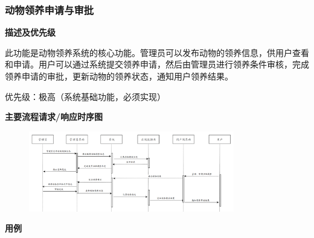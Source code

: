 \documentclass[12pt,a4paper,UTF8]{article}
\begin{document}
\subsubsection{动物领养申请与审批}

\noindent\textbf{描述及优先级}

此功能是动物领养系统的核心功能。管理员可以发布动物的领养信息，供用户查看和申请。用户可以通过系统提交领养申请，然后由管理员进行领养条件审核，完成领养申请的审批，更新动物的领养状态，通知用户领养结果。

优先级：极高（系统基础功能，必须实现）

\noindent\textbf{主要流程请求/响应时序图}

\begin{figure}[H]
  \centering
  \includegraphics[width=0.8\textwidth]{figures/use325.png} 
\end{figure}

\noindent\textbf{用例}
\end{document}
